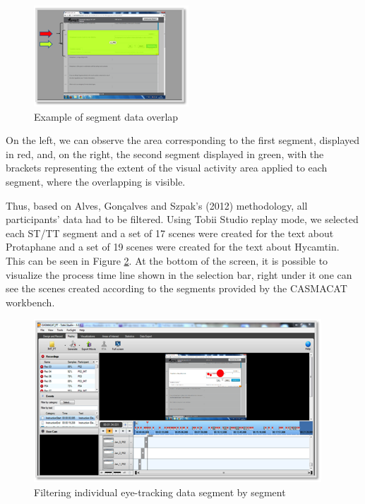\documentclass[output=paper]{langsci/langscibook}
\begin{document}
  
\begin{figure}
 \includegraphics[width=\textwidth]{figures/Sarto4.png}
 \caption{Example of segment data overlap}
 \label{fig:4}
\end{figure} 


On the left, we can observe the area corresponding to the first segment, displayed in red, and, on the right, the second segment displayed in green, with the brackets representing the extent of the visual activity area applied to each segment, where the overlapping is visible. 



Thus, based on Alves, Gonçalves and Szpak’s (2012) methodology, all participants’ data had to be filtered. Using Tobii Studio replay mode, we selected each ST/TT segment and a set of 17 scenes were created for the text about Protaphane and a set of 19 scenes were created for the text about Hycamtin. This can be seen in Figure \ref{fig:5}.  At the bottom of the screen, it is possible to visualize the process time line shown in the selection bar, right under it one can see the scenes created according to the segments provided by the CASMACAT workbench. 


\begin{figure}
 \includegraphics[width=\textwidth]{figures/Sarto5.png}
 \caption{Filtering individual eye-tracking data segment by segment}
 \label{fig:5}
\end{figure} 
\end{document}
